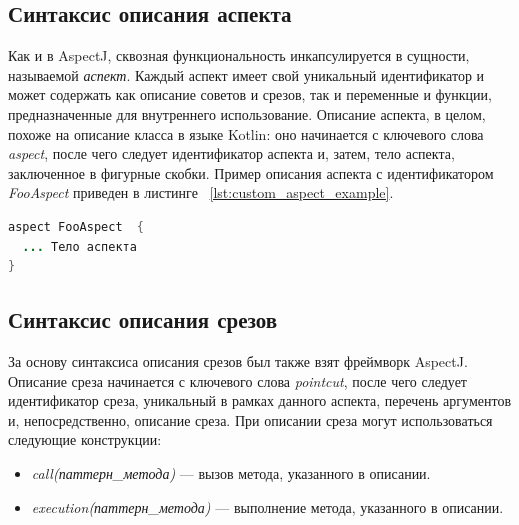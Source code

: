 \subsection{Синтаксис описания аспекта}
\label{sub:custom_aspect_syntax}
Как и в AspectJ, сквозная функциональность инкапсулируется в сущности,
называемой \textit{аспект}.
Каждый аспект имеет свой уникальный идентификатор и может содержать как описание
советов и срезов, так и переменные и функции, предназначенные для внутреннего
использование.
Описание аспекта, в целом, похоже на описание класса в языке Kotlin: оно
начинается с ключевого слова \textit{aspect}, после чего следует идентификатор
аспекта и, затем, тело аспекта, заключенное в фигурные скобки.
Пример описания аспекта с идентификатором \textit{FooAspect} приведен в листинге
~\ref{lst:custom_aspect_example}.
  \begin{lstlisting}[language=Java, label={lst:custom_aspect_example}, 
  caption={Пример описания аспекта в разрабатываемом прототипе}]
aspect FooAspect  {
  ... Тело аспекта
}
  \end{lstlisting}
\subsection{Синтаксис описания срезов}
\label{sub:custom_pointcut_syntax}
За основу синтаксиса описания срезов был также взят фреймворк AspectJ.
Описание среза начинается с ключевого слова \textit{pointcut}, после чего
следует идентификатор среза, уникальный в рамках данного аспекта, перечень
аргументов и, непосредственно, описание среза.
При описании среза могут использоваться следующие конструкции:
\begin{itemize}
	\item \textit{call(паттерн\_метода)} --- вызов метода, указанного в
		  описании.
	\item \textit{execution(паттерн\_метода)} --- выполнение метода,
		  указанного в описании.
\end{itemize}

